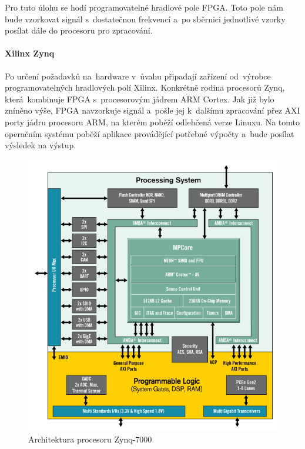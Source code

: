 			Pro tuto úlohu se hodí programovatelné hradlové pole FPGA. Toto pole nám bude vzorkovat signál s~dostatečnou frekvencí a~po sběrnici jednotlivé vzorky posílat dále do procesoru pro zpracování.\par
			
			\paragraph{Xilinx Zynq}
				Po určení požadavků na~hardware v~ůvahu připadají zařízení od~výrobce programovatelných hradlových polí Xilinx. Konkrétně rodina procesorů Zynq, která~kombinuje FPGA s~procesorovým jádrem ARM Cortex.
				Jak již bylo zníněno výše, FPGA navzorkuje signál a~pošle jej k~dalšímu zpracování přez AXI porty jádru procesoru ARM, na kterém poběží odlehčená verze Linuxu. Na tomto operačním systému poběží aplikace provádějící potřebné výpočty a~bude posílat výsledek na výstup.
				
				\begin{figure}[h]
					\begin{center}
						\includegraphics[scale=0.6]{obrazky-figures/zynq-mp-core-single.png}
						\caption{Architektura procesoru Zynq-7000\protect\footnotemark}
						\label{teorie::embedded::zynq}
					\end{center}
				\end{figure}
			
